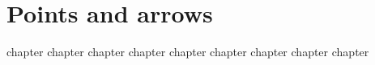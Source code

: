 \part{Points and arrows}
\label{part:first}
{chapter}
{chapter}
{chapter}
{chapter}
{chapter}
{chapter}
{chapter}
{chapter}
{chapter}


\partended
